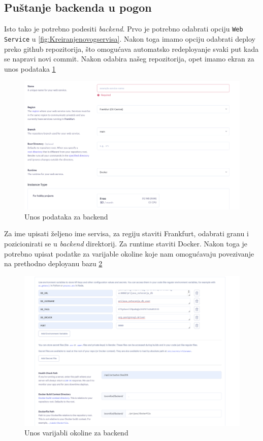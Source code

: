 			\subsection{Puštanje backenda u pogon} 
			Isto tako je potrebno podesiti \textit{backend}. Prvo je potrebno odabrati opciju \texttt{Web Service} u \ref{fig:Kreiranjenovogservisa}.
			Nakon toga imamo opciju odabrati deploy preko github repozitorija, što omogućava automatsko redeployanje svaki put kada se napravi novi commit.
			Nakon odabira našeg repozitorija, opet imamo ekran za unos podataka \ref{fig:UnosPodatakaZaBack}
			\begin{figure}[H]
				\includegraphics[scale=0.40]{slike/render3.png} %
				\centering
				\caption{Unos podataka za backend}
				\label{fig:UnosPodatakaZaBack}
			\end{figure}
			Za ime upisati željeno ime servisa, za regiju staviti Frankfurt, odabrati granu i pozicionirati se u \textit{backend} direktorij. Za runtime staviti Docker.
			Nakon toga je potrebno upisat podatke za varijable okoline koje nam omogućavaju povezivanje na prethodno deployanu bazu \ref{fig:EnvVarijable}
			\begin{figure}[H]
				\includegraphics[scale=0.40]{slike/render4.png} %
				\centering
				\caption{Unos varijabli okoline za backend}
				\label{fig:EnvVarijable}
			\end{figure}

			

			\eject 
